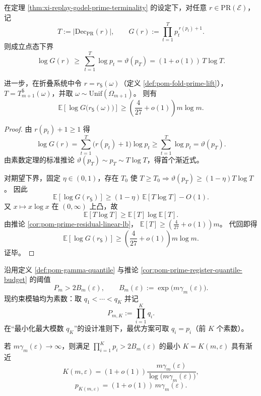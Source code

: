 \begin{theorem}\label{thm:xi-godel-prime-bit-complexity-lower-bound}
在定理 \ref{thm:xi-replay-godel-prime-terminality} 的设定下，对任意 \(r\in\mathrm{PR}(\mathcal E)\)，记
\[
T:=\bigl|\mathrm{Dec}_{\mathrm{PR}}(r)\bigr|,
\qquad
G(r):=\prod_{t=1}^{T}p_t^{\,r(p_t)+1}.
\]
则成立点态下界
\[
\log G(r)\ \ge\ \sum_{t=1}^{T}\log p_t
=
\vartheta(p_T)
=
(1+o(1))\,T\log T.
\]

进一步，在折叠系统中令 \(r=r_{\mathsf S}(\omega)\)（定义 \ref{def:pom-fold-prime-lift}），\(T=T_{m+1}^{\mathsf S}(\omega)\)，并取 \(\omega\sim\mathrm{Unif}(\Omega_{m+1})\)。
则有
\[
\mathbb E\!\left[\log G\!\bigl(r_{\mathsf S}(\omega)\bigr)\right]
\ge
\left(\frac{4}{27}+o(1)\right)m\log m.
\]
\end{theorem}

\begin{proof}
由 \(r(p_t)+1\ge1\) 得
\[
\log G(r)=\sum_{t=1}^{T}\bigl(r(p_t)+1\bigr)\log p_t
\ge
\sum_{t=1}^{T}\log p_t
=
\vartheta(p_T).
\]
由素数定理的标准推论 \(\vartheta(p_T)\sim p_T\sim T\log T\)，得首个渐近式。

对期望下界，固定 \(\eta\in(0,1)\)，存在 \(T_0\) 使 \(T\ge T_0\Rightarrow \vartheta(p_T)\ge (1-\eta)T\log T\)。
因此
\[
\mathbb E[\log G(r_{\mathsf S})]
\ge
(1-\eta)\,\mathbb E[T\log T]-O(1).
\]
又 \(x\mapsto x\log x\) 在 \((0,\infty)\) 上凸，故
\[
\mathbb E[T\log T]\ge \mathbb E[T]\log\mathbb E[T].
\]
由推论 \ref{cor:pom-prime-residual-linear-lb}，
\(
\mathbb E[T]\ge(\frac{4}{27}+o(1))m
\)。
代回即得
\[
\mathbb E[\log G(r_{\mathsf S})]
\ge
\left(\frac{4}{27}+o(1)\right)m\log m.
\]
证毕。
\end{proof}

\begin{proposition}\label{prop:xi-quantile-crt-prime-axis-scaling}
沿用定义 \ref{def:pom-gamma-quantile} 与推论 \ref{cor:pom-prime-register-quantile-budget} 的阈值
\[
P_m>2B_m(\varepsilon),
\qquad
B_m(\varepsilon):=\exp\!\bigl(m\gamma_m(\varepsilon)\bigr).
\]
现约束模轴均为素数：取 \(q_1<\cdots<q_K\) 并记
\[
P_{m,K}:=\prod_{i=1}^{K}q_i.
\]
在“最小化最大模数 \(q_K\)”的设计准则下，最优方案可取 \(q_i=p_i\)（前 \(K\) 个素数）。

若 \(m\gamma_m(\varepsilon)\to\infty\)，则满足
\(
\prod_{i=1}^{K}p_i>2B_m(\varepsilon)
\)
的最小 \(K=K(m,\varepsilon)\) 具有渐近
\[
K(m,\varepsilon)
=
\left(1+o(1)\right)
\frac{m\gamma_m(\varepsilon)}{\log\!\bigl(m\gamma_m(\varepsilon)\bigr)},
\]
\[
p_{K(m,\varepsilon)}
=
\left(1+o(1)\right)\,m\gamma_m(\varepsilon).
\]
\end{proposition}

